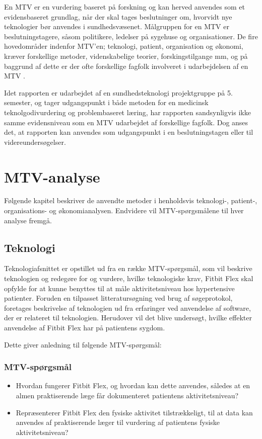 En MTV er en vurdering baseret på forskning og kan herved anvendes som et evidensbaseret grundlag, når der skal tages beslutninger om, hvorvidt nye teknologier bør anvendes i sundhedsvæsenet. Målgruppen for en MTV er beslutningstagere, såsom politikere, ledelser på sygehuse og organisationer. De fire hovedområder indenfor MTV'en; teknologi, patient, organisation og økonomi, kræver forskellige metoder, videnskabelige teorier, forskingstilgange mm, og på baggrund af dette er der ofte forskellige fagfolk involveret i udarbejdelsen af en MTV \citep{mtvhaandbog}. 

Idet rapporten er udarbejdet af en sundhedsteknologi projektgruppe på 5. semester, og tager udgangspunkt i både metoden for en medicinsk teknolgodivurdering og problembaseret læring, har rapporten sandsynligvis ikke samme evidensniveau som en MTV udarbejdet af forskellige fagfolk. Dog anses det, at rapporten kan anvendes som udgangspunkt i en beslutningstagen eller til videreundersøgelser. 


\chapter{MTV-analyse}
Følgende kapitel beskriver de anvendte metoder i henholdsvis teknologi-, patient-, organisations- og økonomianalysen. Endvidere vil MTV-spørgsmålene til hver analyse fremgå. 

\section{Teknologi}\label{sec:metode_tek}
Teknologiafsnittet er opstillet ud fra en række MTV-spørgsmål, som vil beskrive teknologien og redegøre for og vurdere, hvilke teknologiske krav, Fitbit Flex skal opfylde for at kunne benyttes til at måle aktivitetsniveau hos hypertensive patienter. 
Foruden en tilpasset litteratursøgning ved brug af søgeprotokol, foretages beskrivelse af teknologien ud fra erfaringer ved anvendelse af software, der er relateret til teknologien.   
Herudover vil det blive undersøgt, hvilke effekter anvendelse af Fitbit Flex har på patientens sygdom.
 
\noindent
Dette giver anledning til følgende MTV-spørgsmål: 
\subsection{MTV-spørgsmål}
\begin{itemize}
\item Hvordan fungerer Fitbit Flex, og hvordan kan dette anvendes, således at en almen praktiserende læge får dokumenteret patientens aktivitetsniveau?
\item Repræsenterer Fitbit Flex den fysiske aktivitet tilstrækkeligt, til at data kan anvendes af praktiserende læger til vurdering af patientens fysiske aktivitetsniveau?
\end{itemize}


